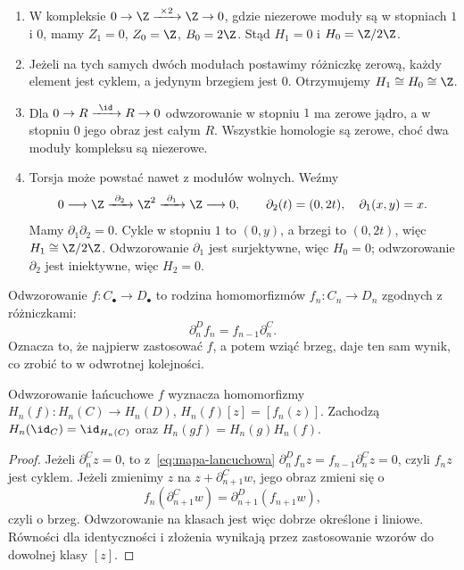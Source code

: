\begin{przyklad}
\label{prz:homologia-rachunki}
\begin{enumerate}[leftmargin=*]
\item W kompleksie
      $0\to\Z\xrightarrow{\ \times2\ }\Z\to0$,
      gdzie niezerowe moduły są w stopniach
      $1$ i $0$, mamy $Z_1=0$, $Z_0=\Z$,
      $B_0=2\Z$. Stąd
      $H_1=0$ i $H_0=\Z/2\Z$.
\item Jeżeli na tych samych dwóch modułach
      postawimy różniczkę zerową, każdy element
      jest cyklem, a jedynym brzegiem jest $0$.
      Otrzymujemy $H_1\cong H_0\cong\Z$.
\item Dla
      $0\to R\xrightarrow{\ \id\ }R\to0$
      odwzorowanie w stopniu $1$ ma zerowe jądro,
      a w stopniu $0$ jego obraz jest całym $R$.
      Wszystkie homologie są zerowe, choć
      dwa moduły kompleksu są niezerowe.
\item Torsja może powstać nawet z modułów
      wolnych. Weźmy
      \[
       0\longrightarrow\Z
       \xrightarrow{\ \partial_2\ }\Z^2
       \xrightarrow{\ \partial_1\ }\Z
       \longrightarrow0,\qquad
       \partial_2(t)=(0,2t),\quad \partial_1(x,y)=x.
      \]
      Mamy $\partial_1\partial_2=0$.
      Cykle w stopniu $1$ to $(0,y)$,
      a brzegi to $(0,2t)$, więc
      $H_1\cong\Z/2\Z$. Odwzorowanie $\partial_1$ jest
      surjektywne, więc $H_0=0$; odwzorowanie
      $\partial_2$ jest iniektywne, więc $H_2=0$.
\end{enumerate}
\end{przyklad}

\begin{definicja}
\label{def:mapa-lancuchowa}
Odwzorowanie $f:C_\bullet\to D_\bullet$ to rodzina
homomorfizmów $f_n:C_n\to D_n$ zgodnych
z różniczkami:
\begin{equation}\label{eq:mapa-lancuchowa}
 \partial^D_n f_n=f_{n-1}\partial^C_n.
\end{equation}
Oznacza to, że najpierw zastosować $f$,
a potem wziąć brzeg, daje ten sam wynik,
co zrobić to w odwrotnej kolejności.
\end{definicja}

\begin{stwierdzenie}
\label{prop:homologia-funktor}
Odwzorowanie łańcuchowe $f$ wyznacza homomorfizmy
$H_n(f):H_n(C)\to H_n(D)$,
$H_n(f)[z]=[f_n(z)]$. Zachodzą
$H_n(\id_C)=\id_{H_n(C)}$ oraz
$H_n(gf)=H_n(g)H_n(f)$.
\end{stwierdzenie}
\begin{proof}
Jeżeli $\partial^C_n z=0$, to z~\eqref{eq:mapa-lancuchowa}
$\partial^D_n f_nz=f_{n-1}\partial^C_nz=0$, czyli
$f_nz$ jest cyklem. Jeżeli zmienimy
$z$ na $z+\partial^C_{n+1}w$, jego obraz zmieni się o
\[
 f_n(\partial^C_{n+1}w)
 =\partial^D_{n+1}(f_{n+1}w),
\]
czyli o brzeg. Odwzorowanie na klasach jest więc
dobrze określone i liniowe.
Równości dla identyczności i złożenia
wynikają przez zastosowanie wzorów
do dowolnej klasy $[z]$.
\end{proof}

